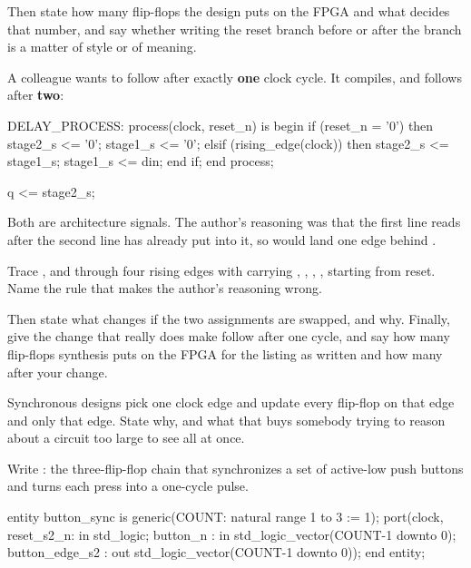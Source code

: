 Then state how many flip-flops the design puts on the FPGA and what decides that number, and say
whether writing the reset branch before or after the  branch is a matter of style
or of meaning. 

 A colleague wants  to follow  after exactly \textbf{one} clock cycle. It
compiles, and  follows  after \textbf{two}:

\begin{vhdlcode}
DELAY_PROCESS: process(clock, reset_n) is
begin
    if (reset_n = '0') then
        stage2_s <= '0';
        stage1_s <= '0';
    elsif (rising_edge(clock)) then
        stage2_s <= stage1_s;
        stage1_s <= din;
    end if;
end process;

q <= stage2_s;
\end{vhdlcode}

\noindent Both are architecture signals. The author's reasoning was that the first line reads
 after the second line has already put  into it, so  would
land one edge behind .

Trace ,  and  through four rising edges with 
carrying , , , , starting from reset. Name the rule that makes the
author's reasoning wrong.

Then state what changes if the two assignments are swapped, and why. Finally, give the change that
really does make  follow  after one cycle, and say how many flip-flops synthesis
puts on the FPGA for the listing as written and how many after your change. 

 Synchronous designs pick one clock edge and update every flip-flop on that edge and only
that edge. State why, and what that buys somebody trying to reason about a circuit too large to see
all at once. 

\label{exb:q:4}

 Write : the three-flip-flop chain that synchronizes a set of active-low
push buttons and turns each press into a one-cycle pulse.

\begin{vhdlcode}
entity button_sync is
    generic(COUNT: natural range 1 to 3 := 1);
    port(clock, reset_s2_n: in  std_logic;
         button_n         : in  std_logic_vector(COUNT-1 downto 0);
         button_edge_s2   : out std_logic_vector(COUNT-1 downto 0));
end entity;
\end{vhdlcode}

